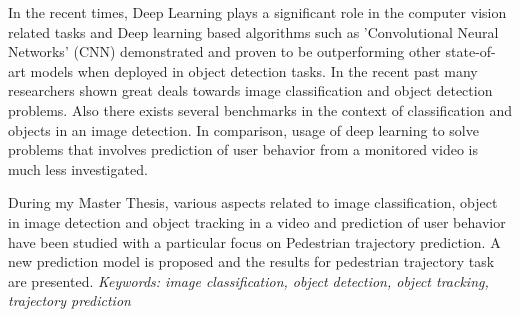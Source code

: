 % 
% 
%
In the recent times, Deep Learning plays a significant role in the computer vision
related tasks and Deep learning based algorithms such as 'Convolutional Neural Networks'
(CNN) demonstrated and proven to be outperforming other state-of-art models when 
deployed in object detection tasks. In the recent past many researchers shown great 
deals towards image classification and object detection problems. Also there exists several 
benchmarks in the context of classification and objects in an image detection. In 
comparison, usage of deep learning to solve problems that involves prediction of 
user behavior from a monitored video is much less investigated.
\baselineskip
\par
During my Master Thesis, various aspects related to image classification, object 
in image detection and object tracking in a video and prediction of user behavior 
have been studied with a particular focus on Pedestrian trajectory prediction. 
A new prediction model is proposed and the results for pedestrian trajectory 
task are presented.
\baselineskip
\textit{Keywords: image classification, object detection, object tracking, trajectory prediction}

